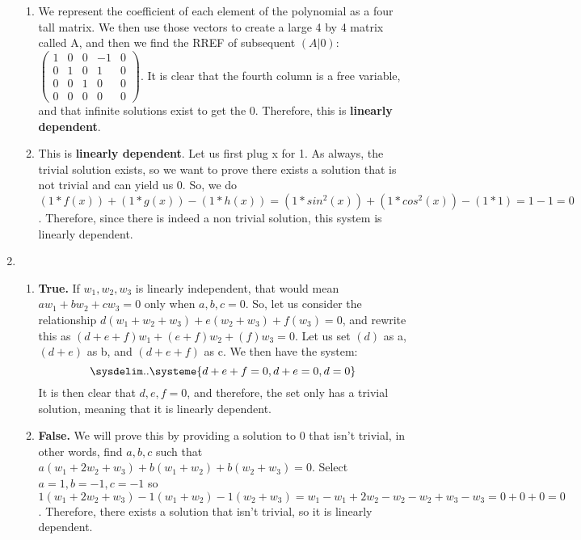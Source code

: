 \documentclass{article}
\begin{document}
\begin{enumerate}
\begin{enumerate}
\item We represent the coefficient of each element of the polynomial as a four tall matrix. We then use those vectors to create a large 4 by 4 matrix called A, and then we find the RREF of subsequent $(A|0)$:  $\left(\begin{array}{cccc|c} 1 & 0 & 0 & -1 & 0 \\ 0 & 1 & 0 & 1 & 0\\ 0 & 0 & 1 & 0 & 0\\ 0 & 0 & 0 & 0 & 0\end{array}\right)$. It is clear that the fourth column is a free variable, and that infinite solutions exist to get the 0. Therefore, this is \textbf{linearly dependent}.

\item This is \textbf{linearly dependent}. Let us first plug x for 1. As always, the trivial solution exists, so we want to prove there exists a solution that is not trivial and can yield us 0. So, we do $(1 * f(x)) + (1 * g(x)) - (1 * h(x)) = (1 * sin^2(x)) + (1 * cos^2(x)) - (1 * 1) = 1 - 1 = 0$. Therefore, since there is indeed a non trivial solution, this system is linearly dependent.

\end{enumerate}

\item

\begin{enumerate}

\item \textbf{True.} If ${w_1,w_2,w_3}$ is linearly independent, that would mean $aw_1 + bw_2 + cw_3 = 0$ only when $a,b,c = 0$. So, let us consider the relationship $d(w_1 + w_2 + w_3) + e(w_2 + w_3) + f(w_3) = 0$, and rewrite this as $(d + e + f) w_1 + (e + f)w_2 + (f)w_3 = 0$. Let us set $(d)$ as a, $(d + e)$ as b, and $(d + e + f)$ as c. We then have the system: 
\[\sysdelim..\systeme{
d + e + f = 0,
d + e = 0,
d = 0
}\]
It is then clear that $d,e,f = 0$, and therefore, the set only has a trivial solution, meaning that it is linearly dependent.
\item \textbf{False.} We will prove this by providing a solution to 0 that isn't trivial, in other words, find $a,b,c$ such that $a(w_1 + 2w_2 + w_3) + b(w_1 + w_2) + b(w_2 + w_3) = 0$. Select $a = 1, b = -1, c = -1$ so $1(w_1 + 2w_2 + w_3) - 1(w_1 + w_2) - 1(w_2 + w_3) = w_1 - w_1 + 2w_2 - w_2 - w_2 + w_3 - w_3 = 0 + 0 + 0 = 0$. Therefore, there exists a solution that isn't trivial, so it is linearly dependent.


\end{enumerate}
\end{enumerate}
\end{document}
